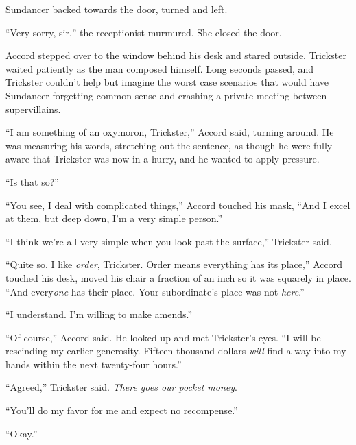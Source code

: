Sundancer backed towards the door, turned and left.



``Very sorry, sir,'' the receptionist murmured.  She closed the door.



Accord stepped over to the window behind his desk and stared outside.  Trickster waited patiently as the man composed himself.  Long seconds passed, and Trickster couldn't help but imagine the worst case scenarios that would have Sundancer forgetting common sense and crashing a private meeting between supervillains.



``I am something of an oxymoron, Trickster,'' Accord said, turning around.  He was measuring his words, stretching out the sentence, as though he were fully aware that Trickster was now in a hurry, and he wanted to apply pressure.



``Is that so?''



``You see, I deal with complicated things,'' Accord touched his mask, ``And I excel at them, but deep down, I'm a very simple person.''



``I think we're all very simple when you look past the surface,'' Trickster said.



``Quite so.  I like \emph{order}, Trickster.  Order means everything has its place,'' Accord touched his desk, moved his chair a fraction of an inch so it was squarely in place.  ``And every\emph{one} has their place.  Your subordinate's place was not \emph{here}.''



``I understand.  I'm willing to make amends.''



``Of course,'' Accord said.  He looked up and met Trickster's eyes.  ``I will be rescinding my earlier generosity.  Fifteen thousand dollars \emph{will} find a way into my hands within the next twenty-four hours.''



``Agreed,'' Trickster said.  \emph{There goes our pocket money}.



``You'll do my favor for me and expect no recompense.''



``Okay.''



